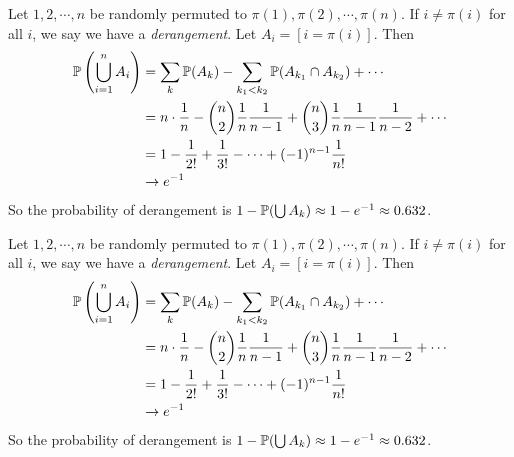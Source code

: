 \begin{note}
  \begin{field}
    \begin{eg}
      Let $1, 2, \cdots, n$ be randomly permuted to $\pi(1), \pi(2), \cdots, \pi(n)$. If
      $i \not= \pi(i)$ for all $i$, we say we have a \emph{derangement}.
      Let $A_i = [i = \pi(i)]$.
      Then
      \begin{align*}
        \P\left(\bigcup _{i = 1}^n A_i\right) &= \sum_{k} \P(A_k) - \sum_{k_1 < k_2} \P(A_{k_1} \cap A_{k_2}) + \cdots\\
        &= n\cdot \frac{1}{n} - \binom{n}{2}\frac{1}{n}\frac{1}{n - 1} + \binom{n}{3}\frac{1}{n}\frac{1}{n - 1}\frac{1}{n - 2} + \cdots\\
        &= 1 - \frac{1}{2!} + \frac{1}{3!} - \cdots + (-1)^{n - 1}\frac{1}{n!}\\
        &\to e^{-1}
      \end{align*}
      So the probability of derangement is $1 - \P(\bigcup A_k) \approx 1 - e^{-1}\approx 0.632$.
    \end{eg}
  \end{field}
  \begin{field}
    \begin{eg}
      Let $1, 2, \cdots, n$ be randomly permuted to $\pi(1), \pi(2), \cdots, \pi(n)$. If
      $i \not= \pi(i)$ for all $i$, we say we have a \emph{derangement}.
      Let $A_i = [i = \pi(i)]$.
      Then
      \begin{align*}
        \P\left(\bigcup _{i = 1}^n A_i\right) &= \sum_{k} \P(A_k) - \sum_{k_1 < k_2} \P(A_{k_1} \cap A_{k_2}) + \cdots\\
        &= n\cdot \frac{1}{n} - \binom{n}{2}\frac{1}{n}\frac{1}{n - 1} + \binom{n}{3}\frac{1}{n}\frac{1}{n - 1}\frac{1}{n - 2} + \cdots\\
        &= 1 - \frac{1}{2!} + \frac{1}{3!} - \cdots + (-1)^{n - 1}\frac{1}{n!}\\
        &\to e^{-1}
      \end{align*}
      So the probability of derangement is $1 - \P(\bigcup A_k) \approx 1 - e^{-1}\approx 0.632$.
    \end{eg}
  \end{field}
  \xplain{}%
\end{note}

